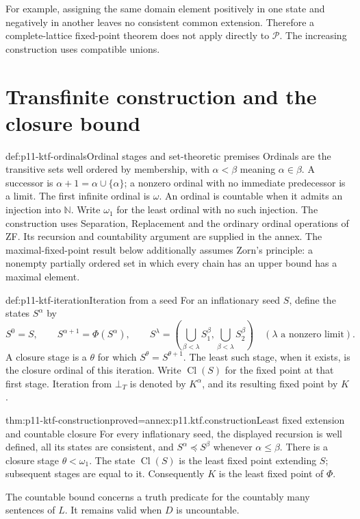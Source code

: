 For example, assigning the same domain element positively in one state and
negatively in another leaves no consistent common extension. Therefore a
complete-lattice fixed-point theorem does not apply directly to
\(\mathcal P\). The increasing construction uses compatible unions.

\section{Transfinite construction and the closure bound}

\begin{hbconvention}{def:p11-ktf-ordinals}{Ordinal stages and set-theoretic premises}
Ordinals are the transitive sets well ordered by membership, with
\(\alpha<\beta\) meaning \(\alpha\in\beta\). A successor is
\(\alpha+1=\alpha\cup\{\alpha\}\); a nonzero ordinal with no immediate
predecessor is a limit. The first infinite ordinal is \(\omega\).
An ordinal is countable when it admits an injection into \(\mathbb N\).
Write \(\omega_1\) for the least ordinal with no such injection.
The construction uses Separation, Replacement and the ordinary ordinal
operations of ZF. Its recursion and countability argument are supplied in
the annex. The maximal-fixed-point result below additionally assumes
Zorn's principle: a nonempty partially ordered set in which every chain
has an upper bound has a maximal element.
\end{hbconvention}

\begin{hbdefinition}{def:p11-ktf-iteration}{Iteration from a seed}
For an inflationary seed \(S\), define the states \(S^\alpha\) by
\[
 S^0=S,\qquad S^{\alpha+1}=\Phi(S^\alpha),\qquad
 S^\lambda=
 \left(\bigcup_{\beta<\lambda}S^\beta_1,
       \bigcup_{\beta<\lambda}S^\beta_2\right)
 \quad(\lambda\text{ a nonzero limit}).
\]
A closure stage is a \(\theta\) for which
\(S^\theta=S^{\theta+1}\). The least such stage, when it exists, is the
closure ordinal of this iteration. Write \(\operatorname{Cl}(S)\) for
the fixed point at that first stage. Iteration from \(\bot_T\) is denoted
by \(K^\alpha\), and its resulting fixed point by \(K\).
\end{hbdefinition}

\begin{hbtheorem}{thm:p11-ktf-construction}{proved=annex:p11.ktf.construction}{Least fixed extension and countable closure}
For every inflationary seed, the displayed recursion is well defined,
all its states are consistent, and
\(S^\alpha\preceq S^\beta\) whenever \(\alpha\leq\beta\).
There is a closure stage \(\theta<\omega_1\).
The state \(\operatorname{Cl}(S)\) is the least fixed point extending
\(S\); subsequent stages are equal to it. Consequently \(K\) is the
least fixed point of \(\Phi\).

The countable bound concerns a truth predicate for the countably many
sentences of \(L\). It remains valid when \(D\) is uncountable.
\end{hbtheorem}

